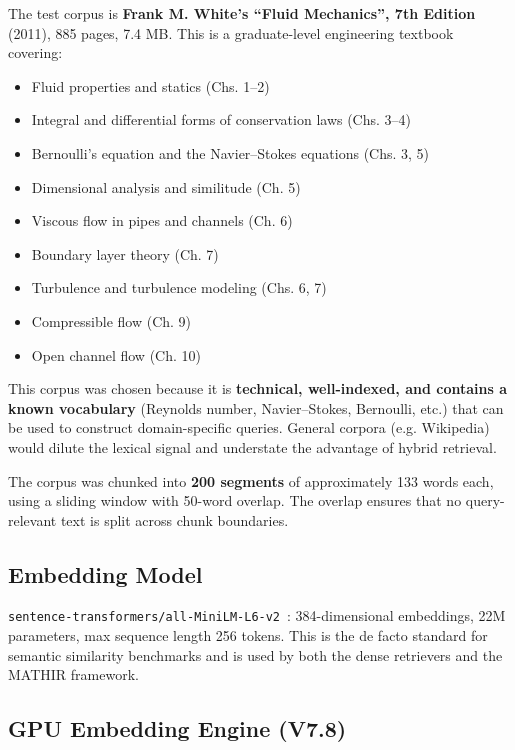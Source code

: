 \documentclass[12pt,a4paper]{article}
\theoremstyle{definition}
\theoremstyle{remark}
\newcommand{\MATHIR}{\textsc{MATHIR}}
\begin{document}
The test corpus is \textbf{Frank M. White's ``Fluid Mechanics'', 7th Edition} (2011), 885 pages, 7.4 MB. This is a graduate-level engineering textbook covering:

\begin{itemize}
    \item Fluid properties and statics (Chs. 1--2)
    \item Integral and differential forms of conservation laws (Chs. 3--4)
    \item Bernoulli's equation and the Navier--Stokes equations (Chs. 3, 5)
    \item Dimensional analysis and similitude (Ch. 5)
    \item Viscous flow in pipes and channels (Ch. 6)
    \item Boundary layer theory (Ch. 7)
    \item Turbulence and turbulence modeling (Chs. 6, 7)
    \item Compressible flow (Ch. 9)
    \item Open channel flow (Ch. 10)
\end{itemize}

This corpus was chosen because it is \textbf{technical, well-indexed, and contains a known vocabulary} (Reynolds number, Navier--Stokes, Bernoulli, etc.) that can be used to construct domain-specific queries. General corpora (e.g. Wikipedia) would dilute the lexical signal and understate the advantage of hybrid retrieval.

The corpus was chunked into \textbf{200 segments} of approximately 133 words each, using a sliding window with 50-word overlap. The overlap ensures that no query-relevant text is split across chunk boundaries.

\subsection{Embedding Model}

\texttt{sentence-transformers/all-MiniLM-L6-v2}~\cite{reimers2019}: 384-dimensional embeddings, 22M parameters, max sequence length 256 tokens. This is the de facto standard for semantic similarity benchmarks and is used by both the dense retrievers and the \MATHIR{} framework.

\subsection{GPU Embedding Engine (V7.8)}
\end{document}
